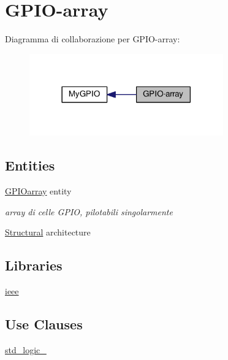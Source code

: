 \hypertarget{group___g_p_i_o-array}{\section{G\+P\+I\+O-\/array}
\label{group___g_p_i_o-array}
}
Diagramma di collaborazione per G\+P\+I\+O-\/array\+:\nopagebreak
\begin{figure}[H]
\begin{center}
\leavevmode
\includegraphics[width=237pt]{group___g_p_i_o-array}
\end{center}
\end{figure}
\subsection*{Entities}
\begin{DoxyCompactItemize}
\item 
\hyperlink{class_g_p_i_oarray}{G\+P\+I\+Oarray} entity
\begin{DoxyCompactList}\small\item\em array di celle G\+P\+I\+O, pilotabili singolarmente \end{DoxyCompactList}\item 
\hyperlink{class_g_p_i_oarray_1_1_structural}{Structural} architecture
\end{DoxyCompactItemize}
\subsection*{Libraries}
 \begin{DoxyCompactItemize}
\item 
\hypertarget{group___g_p_i_o-array_ga0a6af6eef40212dbaf130d57ce711256}{\hyperlink{group___g_p_i_o-array_ga0a6af6eef40212dbaf130d57ce711256}{ieee} }\label{group___g_p_i_o-array_ga0a6af6eef40212dbaf130d57ce711256}

\end{DoxyCompactItemize}
\subsection*{Use Clauses}
 \begin{DoxyCompactItemize}
\item 
\hypertarget{group___g_p_i_o-array_gacd03516902501cd1c7296a98e22c6fcb}{\hyperlink{group___g_p_i_o-array_gacd03516902501cd1c7296a98e22c6fcb}{std\+\_\+logic\+\_}   }\label{group___g_p_i_o-array_gacd03516902501cd1c7296a98e22c6fcb}

\end{DoxyCompactItemize}
